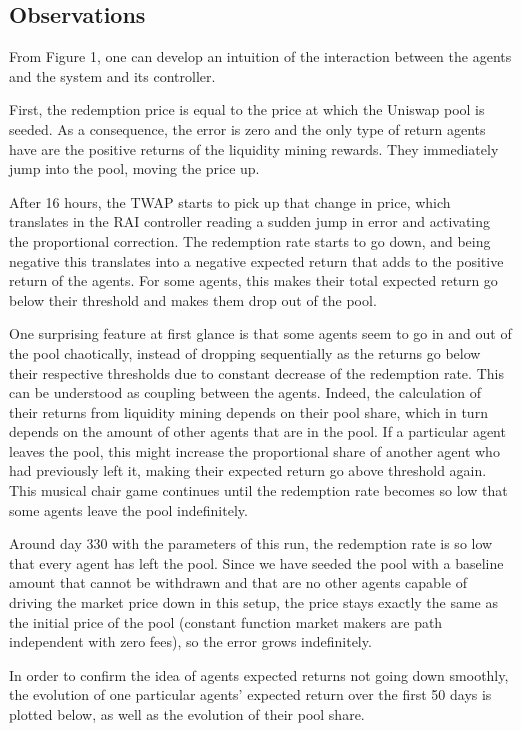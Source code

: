 \documentclass{article}
\begin{document}
    \subsection{Observations}

    From Figure 1, one can develop an intuition of the interaction between the agents and the system and its controller. 
    
    First, the redemption price is equal to the price at which the Uniswap pool is seeded. As a consequence, the error is zero and the only type of return agents have are the positive returns of the liquidity mining rewards. They immediately jump into the pool, moving the price up. 
    
    After 16 hours, the TWAP starts to pick up that change in price, which translates in the RAI controller reading a sudden jump in error and activating the proportional correction. The redemption rate starts to go down, and being negative this translates into a negative expected return that adds to the positive return of the agents. For some agents, this makes their total expected return go below their threshold and makes them drop out of the pool. 

    One surprising feature at first glance is that some agents seem to go in and out of the pool chaotically, instead of dropping sequentially as the returns go below their respective thresholds due to constant decrease of the redemption rate. This can be understood as coupling between the agents. Indeed, the calculation of their returns from liquidity mining depends on their pool share, which in turn depends on the amount of other agents that are in the pool. If a particular agent leaves the pool, this might increase the proportional share of another agent who had previously left it, making their expected return go above threshold again. This musical chair game continues until the redemption rate becomes so low that some agents leave the pool indefinitely. 
    
    Around day 330 with the parameters of this run, the redemption rate is so low that every agent has left the pool. Since we have seeded the pool with a baseline amount that cannot be withdrawn and that are no other agents capable of driving the market price down in this setup, the price stays exactly the same as the initial price of the pool (constant function market makers are path independent with zero fees), so the error grows indefinitely. 

    In order to confirm the idea of agents expected returns not going down smoothly, the evolution of one particular agents' expected return over the first 50 days is plotted below, as well as the evolution of their pool share.
\end{document}
